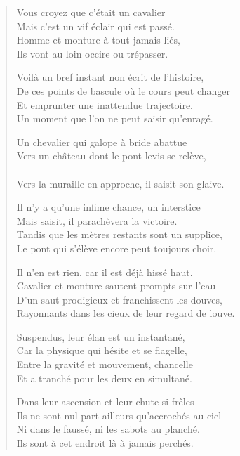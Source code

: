 \begin{verse}\quatrain
  Vous croyez que c’était un cavalier\\ 
  Mais c’est un vif éclair qui est passé.\\ 
  Homme et monture à tout jamais liés,\\ 
  Ils vont au loin occire ou trépasser.  %

  Voilà un bref instant non écrit de l’histoire,\\ 
  De ces points de bascule où le cours peut changer\\ 
  Et emprunter une inattendue trajectoire.\\ 
  Un moment que l’on ne peut saisir qu’enragé.  %

  Un chevalier qui galope à bride abattue\\ 
  Vers un château dont le pont-levis se relève,\\ 
  \\ 
  Vers la muraille en approche, il saisit son glaive.  %

  Il n’y a qu’une infime chance, un interstice\\ 
  Mais saisit, il parachèvera la victoire.\\ 
  Tandis que les mètres restants sont un supplice,\\ 
  Le pont qui s’élève encore peut toujours choir.  %

  Il n’en est rien, car il est déjà hissé haut.\\ 
  Cavalier et monture sautent prompts sur l’eau\\ 
  D’un saut prodigieux et franchissent les douves,\\ 
  Rayonnants dans les cieux de leur regard de louve.

  Suspendus, leur élan est un instantané,\\ 
  Car la physique qui hésite et se flagelle,\\ 
  Entre la gravité et mouvement, chancelle\\ 
  Et a tranché pour les deux en simultané.  %

  Dans leur ascension et leur chute si frêles\\ 
  Ils ne sont nul part ailleurs qu’accrochés au ciel\\ 
  Ni dans le faussé, ni les sabots au planché.\\ 
  Ils sont à cet endroit là à jamais perchés.  %
\end{verse}


